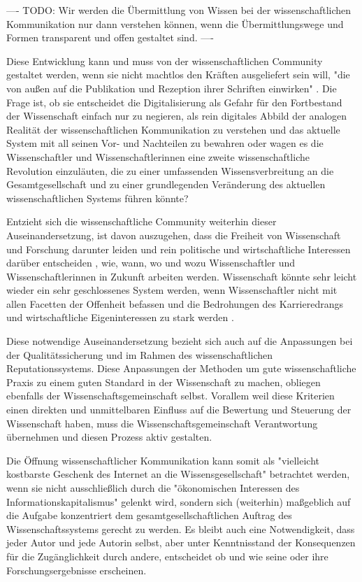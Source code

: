 ---- TODO: Wir werden die Übermittlung von Wissen bei der wissenschaftlichen Kommunikation nur dann verstehen können, wenn die Übermittlungswege und Formen transparent und offen gestaltet sind. \cite{davis_2011_open} ----

Diese Entwicklung kann und muss von der wissenschaftlichen Community gestaltet werden, wenn sie nicht machtlos den Kräften ausgeliefert sein will, "die von außen auf die Publikation und Rezeption ihrer Schriften einwirken" \cite{Hirschi_2015_buch_oa}. Die Frage ist, ob sie entscheidet die Digitalisierung als Gefahr für den Fortbestand der Wissenschaft einfach nur zu negieren, als rein digitales Abbild der analogen Realität der wissenschaftlichen Kommunikation zu verstehen und das aktuelle System mit all seinen Vor- und Nachteilen zu bewahren oder wagen es die Wissenschaftler und Wissenschaftlerinnen eine zweite wissenschaftliche Revolution einzuläuten, die zu einer umfassenden Wissensverbreitung an die Gesamtgesellschaft und zu einer grundlegenden Veränderung des aktuellen wissenschaftlichen Systems führen könnte?

Entzieht sich die wissenschaftliche Community weiterhin dieser Auseinandersetzung, ist davon auszugehen, dass die Freiheit von Wissenschaft und Forschung darunter leiden und rein politische und wirtschaftliche Interessen darüber entscheiden \cite{Warnke_2012}, wie, wann, wo und wozu Wissenschaftler und Wissenschaftlerinnen in Zukunft arbeiten werden. Wissenschaft könnte sehr leicht wieder ein sehr geschlossenes System werden, wenn Wissenschaftler nicht mit allen Facetten der Offenheit befassen und die Bedrohungen des Karrieredrangs und wirtschaftliche Eigeninteressen zu stark werden \cite{resnik_2005_ethics}.

Diese notwendige Auseinandersetzung bezieht sich auch auf die Anpassungen bei der Qualitätssicherung und im Rahmen des wissenschaftlichen Reputationssystems. Diese Anpassungen der Methoden um gute wissenschaftliche Praxis zu einem guten Standard in der Wissenschaft zu machen, obliegen ebenfalls der Wissenschaftsgemeinschaft selbst. Vorallem weil diese Kriterien einen direkten und unmittelbaren Einfluss auf die Bewertung und Steuerung der Wissenschaft haben, muss die Wissenschaftsgemeinschaft Verantwortung übernehmen und diesen Prozess aktiv gestalten.

Die Öffnung wissenschaftlicher Kommunikation kann somit als "vielleicht kostbarste Geschenk des Internet an die Wissensgesellschaft" betrachtet werden, wenn sie nicht ausschließlich durch die "ökonomischen Interessen des Informationskapitalismus" \cite{hagner_2015_sache_buches} gelenkt wird, sondern sich (weiterhin) maßgeblich auf die Aufgabe konzentriert dem gesamtgesellschaftlichen Auftrag des Wissenschaftssystems gerecht zu werden. Es bleibt auch eine Notwendigkeit, dass jeder Autor und jede Autorin selbst, aber unter Kenntnisstand der Konsequenzen für die Zugänglichkeit durch andere, entscheidet ob und wie seine oder ihre Forschungsergebnisse erscheinen.

